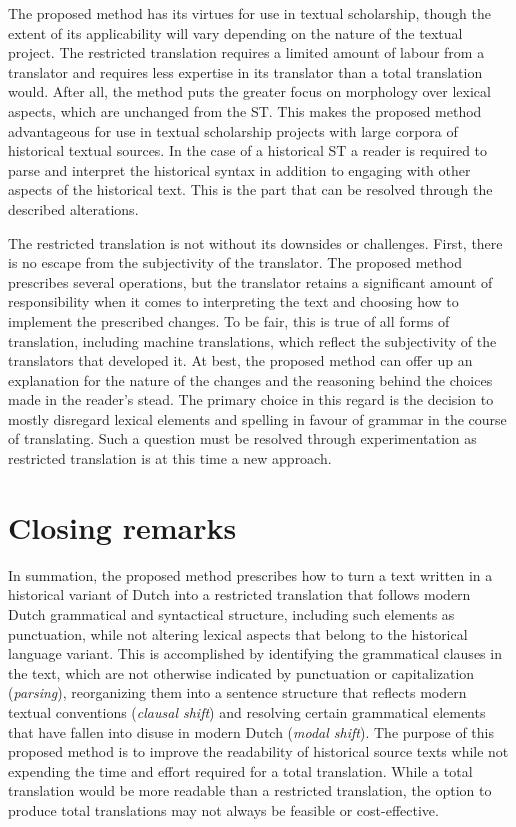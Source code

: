 \begin{paper}
The proposed method has its virtues for use in textual scholarship,
though the extent of its applicability will vary depending on the nature
of the textual project. The restricted translation requires a limited
amount of labour from a translator and requires less expertise in its
translator than a total translation would. After all, the method puts
the greater focus on morphology over lexical aspects, which are
unchanged from the ST. This makes the proposed method advantageous for
use in textual scholarship projects with large corpora of historical
textual sources. In the case of a historical ST a reader is required to
parse and interpret the historical syntax in addition to engaging with
other aspects of the historical text. This is the part that can be
resolved through the described alterations.

The restricted translation is not without its downsides or challenges.
First, there is no escape from the subjectivity of the translator. The
proposed method prescribes several operations, but the translator
retains a significant amount of responsibility when it comes to
interpreting the text and choosing how to implement the prescribed
changes. To be fair, this is true of all forms of translation, including
machine translations, which reflect the subjectivity of the translators
that developed it. At best, the proposed method can offer up an
explanation for the nature of the changes and the reasoning behind the
choices made in the reader's stead. The primary choice in this regard is
the decision to mostly disregard lexical elements and spelling in favour
of grammar in the course of translating. Such a question must be
resolved through experimentation as restricted translation is at this
time a new approach.

\section{Closing remarks}

In summation, the proposed method prescribes how to turn a text written
in a historical variant of Dutch into a restricted translation that
follows modern Dutch grammatical and syntactical structure, including
such elements as punctuation, while not altering lexical aspects that
belong to the historical language variant. This is accomplished by
identifying the grammatical clauses in the text, which are not otherwise
indicated by punctuation or capitalization (\emph{parsing}),
reorganizing them into a sentence structure that reflects modern textual
conventions (\emph{clausal shift}) and resolving certain grammatical
elements that have fallen into disuse in modern Dutch (\emph{modal
shift}). The purpose of this proposed method is to improve the
readability of historical source texts while not expending the time and
effort required for a total translation. While a total translation would
be more readable than a restricted translation, the option to produce
total translations may not always be feasible or cost-effective.


\end{paper}
